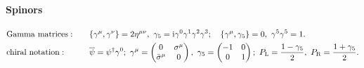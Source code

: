 \documentclass[CheatSheet]{subfiles}
\begin{document}
\paragraph{Spinors}
\begin{alignat}{2}
&\text{Gamma matrices}:&\quad&
\{\gamma^\mu,\gamma^\nu\}=2\eta^{\mu\nu},~
\gamma_5=\mathrm{i}\gamma^0\gamma^1\gamma^2\gamma^3;\quad
\{\gamma^\mu,\gamma_5\}=0,~
\gamma^5\gamma^5=1.
\\
&\text{chiral notation}:&&
 \overline{\psi}=\psi^\dagger\gamma^0;~
 \gamma^\mu=\begin{pmatrix}0&\sigma^\mu\\\bar\sigma^\mu&0\end{pmatrix},~
 \gamma_5=\begin{pmatrix}-1&0\\0&1\end{pmatrix};~
 P_{\text{L}} = \frac{1-\gamma_5}{2},~
 P_{\text{R}} = \frac{1+\gamma_5}{2}.
\end{alignat}
\end{document}
